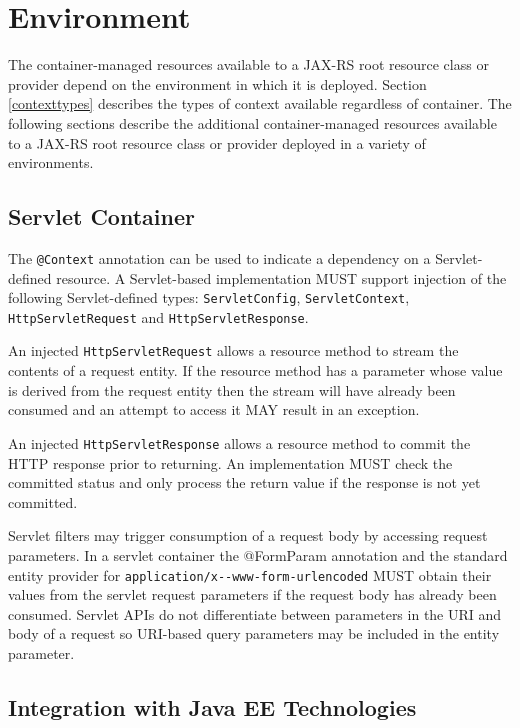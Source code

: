 \chapter{Environment}
\label{environment}

The container-managed resources available to a JAX-RS root resource class or provider depend on the environment in which
it is deployed. Section \ref{contexttypes} describes the types of context available regardless of container. The
following sections describe the additional container-managed resources available to a JAX-RS root resource class or
provider deployed in a variety of environments.

\section{Servlet Container}
\label{servlet_container}

The \lstinline{@Context} annotation can be used to indicate a dependency on a Servlet-defined resource. A Servlet-based
implementation MUST support injection of the following Servlet-defined types: \lstinline{ServletConfig},
\lstinline{ServletContext}, \lstinline{HttpServletRequest} and \lstinline{HttpServletResponse}.

An injected \lstinline{HttpServletRequest} allows a resource method to stream the contents of a request entity. If the
resource method has a parameter whose value is derived from the request entity then the stream will have already been
consumed and an attempt to access it MAY result in an exception.

An injected \lstinline{HttpServletResponse} allows a resource method to commit the HTTP response prior to returning. An
implementation MUST check the committed status and only process the return value if the response is not yet committed.

Servlet filters may trigger consumption of a request body by accessing request parameters. In a servlet container the
@FormParam annotation and the standard entity provider for \lstinline{application/x--www-form-urlencoded} MUST obtain
their values from the servlet request parameters if the request body has already been consumed. Servlet APIs do not
differentiate between parameters in the URI and body of a request so URI-based query parameters may be included in the
entity parameter.

\section{Integration with Java EE Technologies}
\label{javaee}

